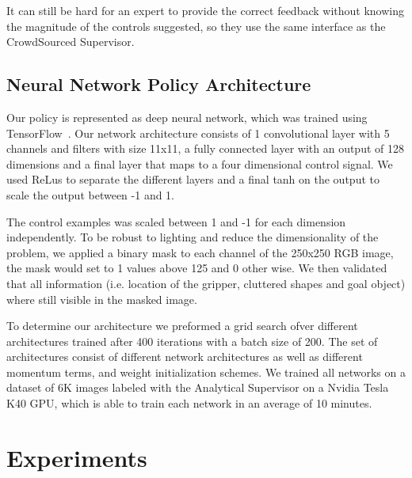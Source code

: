 \documentclass[10pt, conference]{ieeeconf}      %
\begin{document}
It can still be hard for an expert to provide the correct feedback without knowing the magnitude of the controls suggested, so they use the same interface as the CrowdSourced Supervisor. 

\subsection{ Neural Network Policy Architecture}
Our policy is represented as deep neural network, which was trained using TensorFlow~\cite{tensorflow2015-whitepaper}. Our network architecture consists of 1 convolutional layer with 5 channels and filters with size 11x11, a fully connected layer with an output of 128 dimensions and a final layer that maps to a four dimensional control signal. We used ReLus to separate the different layers and a final tanh on the output to scale the output between -1 and 1. 

The control examples was scaled between 1 and -1 for each dimension independently. To be robust to lighting and reduce the dimensionality of the problem, we applied a binary mask to each channel of the 250x250 RGB image, the mask would set to 1 values above 125 and 0 other wise.  We then validated that all information (i.e. location of the gripper, cluttered shapes and goal object) where still visible in the masked image. 

To determine our architecture we preformed a grid search ofver different architectures  trained after 400 iterations with a batch size of 200. The set of architectures consist of different network architectures as well as different momentum terms, and weight initialization schemes. We trained all networks on a dataset of 6K images labeled with the Analytical Supervisor on a Nvidia Tesla K40 GPU, which is able to train each network in an average of 10 minutes.  


\section{Experiments} \label{sec:Exp}
\end{document}
